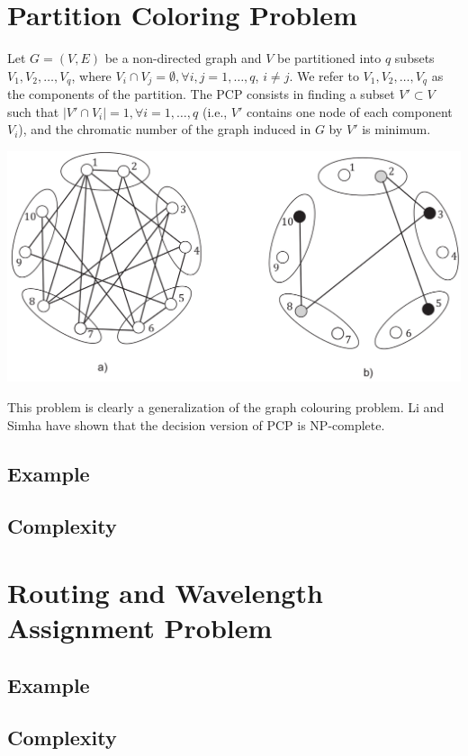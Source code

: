 \section{Partition Coloring Problem}

Let $G = (V, E)$ be a non-directed graph and $V$ be partitioned into $q$ subsets $V_1, V_2,\ldots, V_q$, where $V_i \cap V_j = \emptyset, \forall i, j = 1, \ldots , q$, $i \neq j$. We refer to $V_1, V_2, \ldots , V_q$ as the components of the partition. The PCP consists in finding a subset $V' \subset V$ such that $|V' \cap V_i| = 1, \forall i = 1, \ldots , q$ (i.e., $V'$ contains one node of each component $V_i$), and the chromatic number of the graph induced in $G$ by $V'$ is minimum.

\begin{center}
\includegraphics[scale=0.3]{figures/pcp.png}
\end{center}


This problem is clearly a generalization of the graph colouring problem. Li and Simha \cite{li-00}	
have shown that the decision version of PCP is
NP-complete.


\subsection{Example}

\subsection{Complexity}

\section{Routing and Wavelength Assignment Problem}

\subsection{Example}

\subsection{Complexity}


